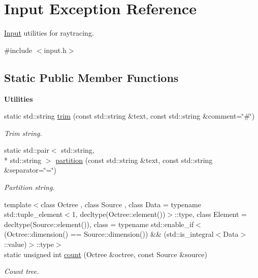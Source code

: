\hypertarget{exceptionInput}{\section{Input Exception Reference}
\label{exceptionInput}
}


\hyperlink{exceptionInput}{Input} utilities for raytracing.  




{\ttfamily \#include $<$input.\-h$>$}

\subsection*{Static Public Member Functions}
\begin{Indent}{\bf Utilities}\par
\begin{DoxyCompactItemize}
\item 
static std\-::string \hyperlink{exceptionInput_a8a98c85776bc73b49f4b3a4e30b243b7}{trim} (const std\-::string \&text, const std\-::string \&comment=\char`\"{}\#\char`\"{})
\begin{DoxyCompactList}\small\item\em Trim string. \end{DoxyCompactList}\item 
static std\-::pair$<$ std\-::string, \\*
std\-::string $>$ \hyperlink{exceptionInput_a859c8e0b3921a0e8bbd79bc96272935e}{partition} (const std\-::string \&text, const std\-::string \&separator=\char`\"{}=\char`\"{})
\begin{DoxyCompactList}\small\item\em Partition string. \end{DoxyCompactList}\item 
{\footnotesize template$<$class Octree , class Source , class Data  = typename std\-::tuple\-\_\-element$<$1, decltype(\-Octree\-::element())$>$\-::type, class Element  = decltype(\-Source\-::element()), class  = typename std\-::enable\-\_\-if$<$(\-Octree\-::dimension() == Source\-::dimension()) \&\& (std\-::is\-\_\-integral$<$\-Data$>$\-::value)$>$\-::type$>$ }\\static unsigned int \hyperlink{exceptionInput_a1ec66a2edaab4da06525453503e9cc3c}{count} (Octree \&octree, const Source \&source)
\begin{DoxyCompactList}\small\item\em Count tree. \end{DoxyCompactList}\item 

\end{DoxyCompactItemize}
\end{Indent}
